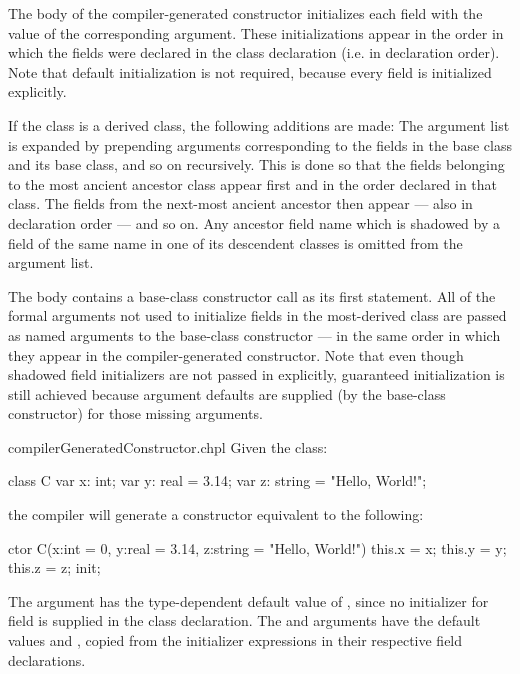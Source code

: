 The body of the compiler-generated
constructor initializes each field with the value of the corresponding
argument.  These initializations appear in the order in which the fields were
declared in the class declaration (i.e. in declaration order).  Note that default
initialization is not required, because every field is initialized explicitly.

If the class is a derived class, the following additions are made: The argument
list is expanded by prepending arguments corresponding to the fields in the base
class and its base class, and so on recursively.  This is done so that the
fields belonging to the most ancient ancestor class appear first and in the
order declared in that class.  The fields from the next-most ancient ancestor
then appear --- also in declaration order --- and so on.  Any ancestor field name
which is shadowed by a field of the same name in one of its descendent classes
is omitted from the argument list.  

The body contains a base-class constructor call
as its first statement.  All of the formal arguments not used to initialize
fields in the most-derived class are passed as named arguments to the
base-class constructor --- in the same order in which they appear in the
compiler-generated constructor.
Note that even though shadowed field initializers are not passed in explicitly,
guaranteed initialization is still achieved because argument defaults are
supplied (by the base-class constructor) for those missing arguments.

\begin{chapelexample}{compilerGeneratedConstructor.chpl}
Given the class:
\begin{chapel}
class C {
  var x: int;
  var y: real = 3.14;
  var z: string = "Hello, World!";
}
\end{chapel}
the compiler will generate a constructor equivalent to the following:
\begin{chapel}
ctor C(x:int = 0, y:real = 3.14, z:string = "Hello, World!")
{ this.x = x; this.y = y; this.z = z; init; }
\end{chapel}
The  argument has the type-dependent default value of , since no initializer for
field  is supplied in the class declaration. The  and 
arguments have the default values  and ,
copied from the initializer expressions in their respective field declarations.
\end{chapelexample}

